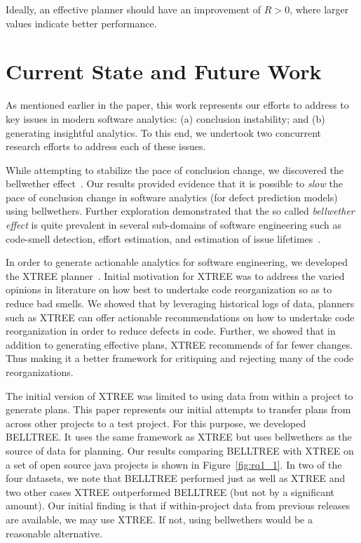 \documentclass[conference]{IEEEtran}
\newcommand{\fig}[1]{Figure~\ref{fig:#1}}
\theoremstyle{break}
\begin{document}
Ideally, an effective planner should have an improvement of $R>0$, where larger values indicate better performance. 

\section{Current State and Future Work}

As mentioned earlier in the paper, this work represents our efforts to address to key issues in modern software analytics: (a) conclusion instability; and (b) generating insightful analytics. To this end, we undertook two concurrent research efforts to address each of these issues. 

While attempting to stabilize the pace of conclusion change, we discovered the bellwether effect~\cite{krishna16}. Our results provided evidence that it is possible to \textit{slow} the pace of conclusion change in software analytics (for defect prediction models) using bellwethers. Further exploration demonstrated that the so called \textit{bellwether effect} is quite prevalent in several sub-domains of software engineering such as code-smell detection, effort estimation, and estimation of issue lifetimes~\cite{krishna17b}.

In order to generate actionable analytics for software engineering, we developed the XTREE planner~\cite{krishna17a}. Initial motivation for XTREE was to address the varied opinions in literature on how best to undertake code reorganization so as to reduce bad smells. We showed that by leveraging historical logs of data, planners such as XTREE can offer actionable recommendations on how to undertake code reorganization in order to reduce defects in code. Further, we showed that in addition to generating effective plans, XTREE recommends of far fewer changes. Thus making it a better framework for critiquing and rejecting many of the code reorganizations.


The initial version of XTREE was limited to using data from within a project to generate plans. This paper represents our initial attempts to transfer plans from across other projects to a test project. For this purpose, we developed BELLTREE. It uses the same framework as XTREE but uses bellwethers as the source of data for planning.
Our results comparing BELLTREE with XTREE on a set of open source java projects is shown in \fig{rq1_1}. In two of the four datasets, we note that BELLTREE performed just as well as XTREE and two other cases XTREE outperformed BELLTREE (but not by a significant amount). Our initial finding is that if within-project data from previous releases are available, we may use XTREE. If not, using bellwethers would be a reasonable alternative.
\end{document}
